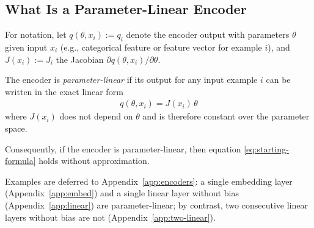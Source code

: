\subsection{What Is a Parameter-Linear Encoder}

For notation, let
\( q(\theta, x_i) := q_i \) 
denote the encoder output with parameters $\theta$ given input $x_i$ (e.g., categorical feature or feature vector for example $i$), and
\( J(x_i) := J_i \) 
the Jacobian $\partial q(\theta, x_i)/\partial\theta$.

The encoder is \emph{parameter-linear} if its output for any input example $i$ can be written in the exact linear form
\begin{align}
q(\theta, x_i) = J(x_i)\,\theta
\end{align}
where $J(x_i)$ does not depend on $\theta$ and is therefore constant over the parameter space.

Consequently, if the encoder is parameter-linear, then equation \eqref{eq:starting-formula} holds without approximation.

Examples are deferred to Appendix~\ref{app:encoders}: a single embedding layer (Appendix~\ref{app:embed}) and a single linear layer without bias (Appendix~\ref{app:linear}) are parameter-linear; by contrast, two consecutive linear layers without bias are not (Appendix~\ref{app:two-linear}).